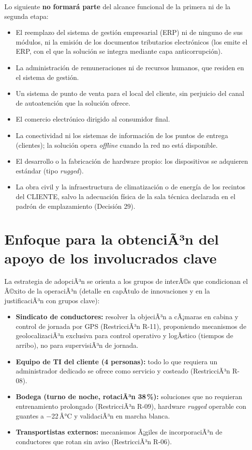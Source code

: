 Lo siguiente \textbf{no formará parte} del alcance funcional de la primera ni de la segunda etapa:

\begin{itemize}
  \item El reemplazo del sistema de gestión empresarial (ERP) ni de ninguno de sus módulos,
        ni la emisión de los documentos tributarios electrónicos (los emite el ERP, con el
        que la solución se integra mediante capa anticorrupción).
  \item La administración de remuneraciones ni de recursos humanos, que residen en el
        sistema de gestión.
  \item Un sistema de punto de venta para el local del cliente, sin perjuicio del canal
        de autoatención que la solución ofrece.
  \item El comercio electrónico dirigido al consumidor final.
  \item La conectividad ni los sistemas de información de los puntos de entrega
        (clientes); la solución opera \emph{offline} cuando la red no está disponible.
  \item El desarrollo o la fabricación de hardware propio: los dispositivos se adquieren
        estándar (tipo \emph{rugged}).
  \item La obra civil y la infraestructura de climatización o de energía de los recintos
        del CLIENTE, salvo la adecuación física de la sala técnica declarada en el padrón
        de emplazamiento (Decisión 29).
\end{itemize}

\section{Enfoque para la obtenciÃ³n del apoyo de los involucrados clave}

La estrategia de adopciÃ³n se orienta a los grupos de interÃ©s que condicionan el Ã©xito de
la operaciÃ³n (detalle en capÃ­tulo de innovaciones y en la justificaciÃ³n con grupos
clave):

\begin{itemize}
  \item \textbf{Sindicato de conductores:} resolver la objeciÃ³n a cÃ¡maras en cabina y
        control de jornada por GPS (RestricciÃ³n R-11), proponiendo mecanismos de
        geolocalizaciÃ³n exclusiva para control operativo y logÃ­stico (tiempos de
        arribo), no para supervisiÃ³n de jornada.
  \item \textbf{Equipo de TI del cliente (4 personas):} todo lo que requiera un
        administrador dedicado se ofrece como servicio y costeado (RestricciÃ³n R-08).
  \item \textbf{Bodega (turno de noche, rotaciÃ³n 38\,\%):} soluciones que no requieran
        entrenamiento prolongado (RestricciÃ³n R-09), hardware \emph{rugged} operable con
        guantes a $-$22\,Â°C y validaciÃ³n en marcha blanca.
  \item \textbf{Transportistas externos:} mecanismos Ã¡giles de incorporaciÃ³n de
        conductores que rotan sin aviso (RestricciÃ³n R-06).
\end{itemize}

